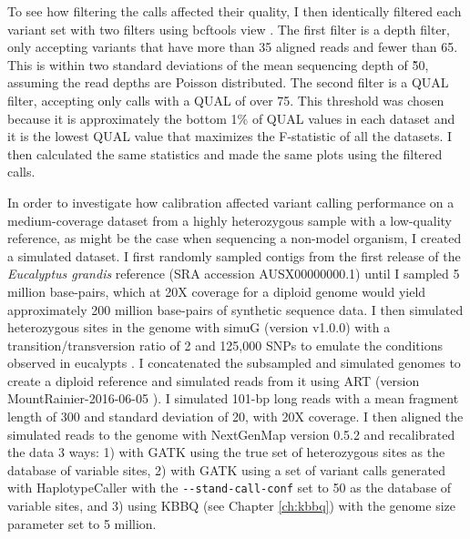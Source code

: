 To see how filtering the calls affected their quality, I then identically filtered each variant set with two filters using bcftools view \parencite{li_sequence_2009}. The first filter is a depth filter, only accepting variants that have more than 35 aligned reads and fewer than 65. This is within two standard deviations of the mean sequencing depth of \~50, assuming the read depths are Poisson distributed. The second filter is a QUAL filter, accepting only calls with a QUAL of over 75. This threshold was chosen because it is approximately the bottom 1\% of QUAL values in each dataset and it is the lowest QUAL value that maximizes the F-statistic of all the datasets. I then calculated the same statistics and made the same plots using the filtered calls.



%
In order to investigate how calibration affected variant calling performance on a medium-coverage dataset from a highly heterozygous sample with a low-quality reference, as might be the case when sequencing a non-model organism, I created a simulated dataset. I first randomly sampled contigs from the first release of the \textit{Eucalyptus grandis} reference (SRA accession AUSX00000000.1) until I sampled 5 million base-pairs, which at 20X coverage for a diploid genome would yield approximately 200 million base-pairs of synthetic sequence data. I then simulated heterozygous sites in the genome with simuG (version v1.0.0) \parencite{yue_simug_2019} with a transition/transversion ratio of 2 and 125,000 SNPs to emulate the conditions observed in eucalypts \parencite{kulheim_comparative_2009}. I concatenated the subsampled and simulated genomes to create a diploid reference and simulated reads from it using ART (version MountRainier-2016-06-05 \cite{huang_art_2012}). I simulated 101-bp long reads with a mean fragment length of 300 and standard deviation of 20, with 20X coverage. I then aligned the simulated reads to the genome with NextGenMap version 0.5.2 \parencite{sedlazeck_nextgenmap_2013} and recalibrated the data 3 ways: 1) with GATK using the true set of heterozygous sites as the database of variable sites, 2) with GATK using a set of variant calls generated with HaplotypeCaller with the \texttt{-\phantom{}-stand-call-conf} set to 50 as the database of variable sites, and 3) using KBBQ (see Chapter \ref{ch:kbbq}) with the genome size parameter set to 5 million.

